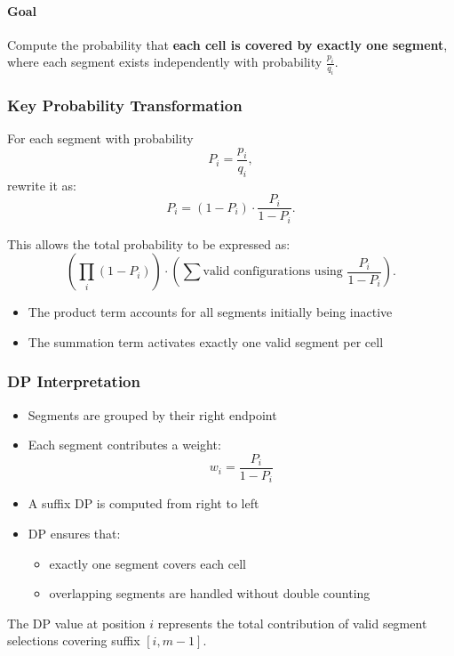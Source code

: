 \documentclass[11pt]{article}
\begin{document}
\paragraph{Goal}
Compute the probability that \textbf{each cell is covered by exactly one segment},
where each segment exists independently with probability $\frac{p_i}{q_i}$.

\subsubsection{Key Probability Transformation}

For each segment with probability
\[
P_i = \frac{p_i}{q_i},
\]
rewrite it as:
\[
P_i = (1 - P_i) \cdot \frac{P_i}{1 - P_i}.
\]

This allows the total probability to be expressed as:
\[
\left( \prod_i (1 - P_i) \right)
\cdot
\left( \sum \text{valid configurations using } \frac{P_i}{1 - P_i} \right).
\]

\begin{itemize}
    \item The product term accounts for all segments initially being inactive
    \item The summation term activates exactly one valid segment per cell
\end{itemize}

\subsubsection{DP Interpretation}

\begin{itemize}
    \item Segments are grouped by their right endpoint
    \item Each segment contributes a weight:
    \[
    w_i = \frac{P_i}{1 - P_i}
    \]
    \item A suffix DP is computed from right to left
    \item DP ensures that:
    \begin{itemize}
        \item exactly one segment covers each cell
        \item overlapping segments are handled without double counting
    \end{itemize}
\end{itemize}

The DP value at position $i$ represents the total contribution of valid
segment selections covering suffix $[i, m-1]$.
\end{document}
